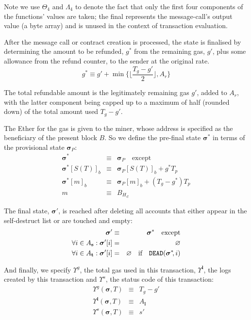 \documentclass[9pt,oneside]{amsart}
\begin{document}
\begin{multicols}{2}
Note we use $\Theta_{4}$ and $\Lambda_{4}$ to denote the fact that only the first four components of the functions' values are taken; the final represents the message-call's output value (a byte array) and is unused in the context of transaction evaluation.

After the message call or contract creation is processed, the state is finalised by determining the amount to be refunded, $g^*$ from the remaining gas, $g'$, plus some allowance from the refund counter, to the sender at the original rate.
\begin{equation}
g^* \equiv g' + \min \{ \Big\lfloor \dfrac{T_g - g'}{2} \Big\rfloor, A_r \}
\end{equation}

The total refundable amount is the legitimately remaining gas $g'$, added to $A_r$, with the latter component being capped up to a maximum of half (rounded down) of the total amount used $T_g - g'$.

The Ether for the gas is given to the miner, whose address is specified as the beneficiary of the present block $B$. So we define the pre-final state $\boldsymbol{\sigma}^*$ in terms of the provisional state $\boldsymbol{\sigma}_P$:
\begin{eqnarray}
\boldsymbol{\sigma}^* & \equiv & \boldsymbol{\sigma}_P \quad \text{except} \\
\boldsymbol{\sigma}^*[S(T)]_b & \equiv & \boldsymbol{\sigma}_P[S(T)]_b + g^* T_p \\
\boldsymbol{\sigma}^*[m]_b & \equiv & \boldsymbol{\sigma}_P[m]_b + (T_g - g^*) T_p \\
m & \equiv & {B_H}_c
\end{eqnarray}

The final state, $\boldsymbol{\sigma}'$, is reached after deleting all accounts that either appear in the self-destruct list or are touched and empty:
\begin{eqnarray}
\boldsymbol{\sigma}' & \equiv & \boldsymbol{\sigma}^* \quad \text{except} \\
\forall i \in A_\mathbf{s}: \boldsymbol{\sigma}'[i] & = & \varnothing \\
\forall i \in A_\mathbf{t}: \boldsymbol{\sigma}'[i] & = & \varnothing \quad\text{if}\quad \mathtt{\tiny DEAD}(\boldsymbol{\sigma}^*\kern -2pt, i)
\end{eqnarray}

And finally, we specify $\Upsilon^g$, the total gas used in this transaction, $\Upsilon^\mathbf{l}$, the logs created by this transaction and $\Upsilon^{s}$, the status code of this transaction:
\begin{eqnarray}
\Upsilon^g(\boldsymbol{\sigma}, T) & \equiv & T_g - g' \\
\Upsilon^\mathbf{l}(\boldsymbol{\sigma}, T) & \equiv & A_\mathbf{l} \\
\Upsilon^s(\boldsymbol{\sigma}, T) & \equiv & s'
\end{eqnarray}


\end{multicols}
\end{document}
